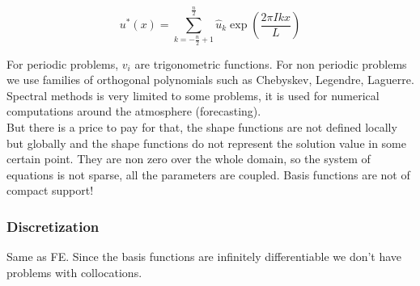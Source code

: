\begin{equation}
u^* (x) = \sum _{k = -\frac{n}{2}+1}^{\frac{n}{2}}\hat{u}_k\exp \left( \frac{2\pi Ikx}{L}\right)
\end{equation}

For periodic problems, $v_i$ are trigonometric functions. For non periodic problems we use families of orthogonal polynomials such as Chebyskev, Legendre, Laguerre. Spectral methods is very limited to some problems, it is used for numerical computations around the atmosphere (forecasting).\\

But there is a price to pay for that, the shape functions are not defined locally but globally and the shape functions do not represent the solution value in some certain point. They are non zero over the whole domain, so the system of equations is not sparse, all the parameters are coupled. Basis functions are not of compact support! 

\subsubsection{Discretization}
Same as FE. Since the basis functions are infinitely differentiable we don't have problems with collocations. 


 
